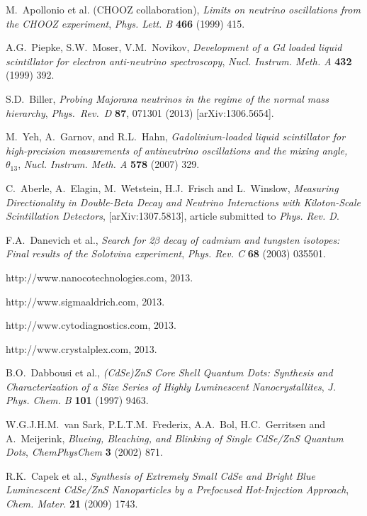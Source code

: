 \documentclass[cits]{JINST}
\begin{document}
\begin{thebibliography}{9}
M.~Apollonio et al. (CHOOZ collaboration), \emph{Limits on neutrino oscillations from the CHOOZ experiment}, \emph{Phys. Lett. B} {\bf 466} (1999) 415.

A.G.~Piepke, S.W.~Moser, V.M.~Novikov, \emph{Development of a Gd loaded liquid scintillator for electron anti-neutrino spectroscopy}, \emph{Nucl. Instrum. Meth. A} {\bf 432} (1999) 392.

S.D.~Biller, \emph{Probing Majorana neutrinos in the regime of the normal mass hierarchy}, \emph{Phys.\ Rev.\ D} {\bf 87}, 071301 (2013) [arXiv:1306.5654].

M.~Yeh, A.~Garnov, and R.L.~Hahn, \emph{Gadolinium-loaded liquid scintillator for high-precision measurements
of antineutrino oscillations and the mixing angle, $\theta_{13}$}, \emph{Nucl. Instrum. Meth. A} {\bf 578} (2007) 329.

C.~Aberle, A.~Elagin, M.~Wetstein, H.J.~Frisch and L.~Winslow, \emph{Measuring Directionality in Double-Beta Decay and Neutrino Interactions with Kiloton-Scale Scintillation Detectors}, [arXiv:1307.5813], article submitted to \emph{Phys. Rev. D}. 
 
F.A.~Danevich et al., \emph{Search for 2$\beta$ decay of cadmium and tungsten isotopes: Final results of the Solotvina experiment}, \emph{Phys. Rev. C} {\bf 68} (2003) 035501.

http://www.nanocotechnologies.com, 2013. 

http://www.sigmaaldrich.com, 2013. 

http://www.cytodiagnostics.com, 2013.

http://www.crystalplex.com, 2013. 

B.O.~Dabbousi et al., \emph{(CdSe)ZnS Core Shell Quantum Dots: Synthesis and Characterization of a Size Series of Highly Luminescent Nanocrystallites}, \emph{J. Phys. Chem. B} {\bf 101} (1997) 9463.

W.G.J.H.M.~van Sark, P.L.T.M.~Frederix, A.A.~Bol, H.C.~Gerritsen and A.~Meijerink, \emph{Blueing, Bleaching, and Blinking of Single CdSe/ZnS Quantum Dots}, \emph{ChemPhysChem} {\bf 3} (2002) 871.

R.K.~Capek et al., \emph{Synthesis of Extremely Small CdSe and Bright Blue Luminescent CdSe/ZnS Nanoparticles by a Prefocused Hot-Injection Approach}, \emph{Chem. Mater.} {\bf 21} (2009) 1743.


\end{thebibliography}
\end{document}
